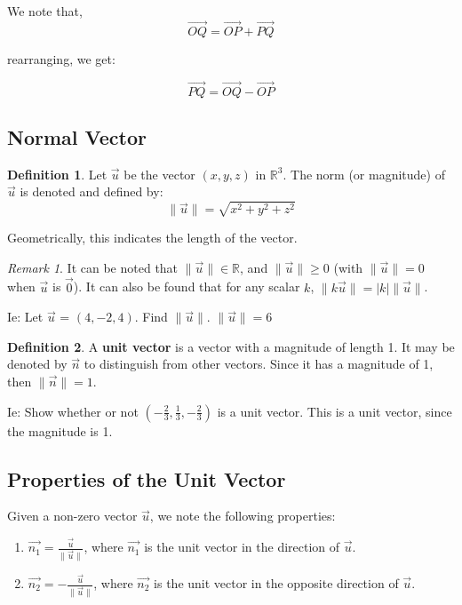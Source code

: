 \documentclass[11pt]{article}
\theoremstyle{plain} %
\theoremstyle{definition}
\newtheorem*{definition}{Definition} %
\theoremstyle{example}
\theoremstyle{remark}
\newtheorem*{remark}{Remark}
\begin{document}
We note that, 
$$\overrightarrow{OQ} = \overrightarrow{OP}  + \overrightarrow{PQ} $$


rearranging, we get:

$$\overrightarrow{PQ} = \overrightarrow{OQ}  - \overrightarrow{OP} $$

\subsection{Normal Vector}

\begin{definition}
Let $\vec{u}$ be the vector $(x, y, z)$ in  $\mathbb R^3$. The norm (or magnitude) of $\vec{u}$ is denoted and defined by: $$\|\vec{u}\|= \sqrt{x^2+y^2+z^2}$$
\end{definition}
Geometrically, this indicates the length of the vector.
\begin{remark} It can be noted that $\|\vec{u}\| \in \mathbb R$, and $\|\vec{u}\| \geq0$ (with $\|\vec{u}\| = 0$ when $\vec{u}$ is $\overrightarrow{0}$). It can also be found that for any scalar $k$, $\|k\vec{u}\| = |k|\|\vec{u}\|$.
\end{remark}
\bigskip

Ie: Let $\vec{u}$ = $(4, -2, 4)$. Find $\|\vec{u}\|$. $\|\vec{u}\| = 6$

\begin{definition}
A \textbf{unit vector} is a vector with a magnitude of length 1. It may be denoted by $\vec{n}$ to distinguish from other vectors. Since it has a magnitude of 1, then $\|\vec{n}\| = 1$.
\end{definition}
\bigskip
Ie: Show whether or not $\left(-\frac{2}{3}, \frac{1}{3}, -\frac{2}{3}\right)$ is a unit vector. This is a unit vector, since the magnitude is 1. 

\subsection{Properties of the Unit Vector}

Given a non-zero vector $\vec{u}$, we note the following properties:

\begin{enumerate}
	\item $\vec{n_1} = \frac{\vec{u}}{\|\vec{u}\|}$, where $\vec{n_1}$ is the unit vector in the direction of $\vec{u}$.
	\item $\vec{n_2} = -\frac{\vec{u}}{\|\vec{u}\|}$, where $\vec{n_2}$ is the unit vector in the opposite direction of $\vec{u}$.
\end{enumerate}	
\end{document}
